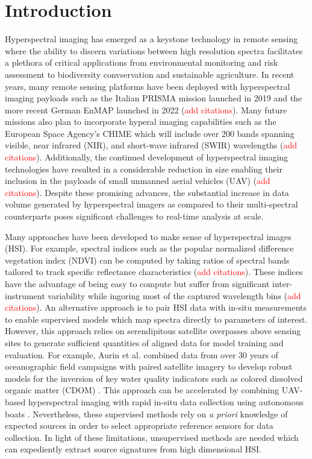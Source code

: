\documentclass[remotesensing,article,submit,pdftex,moreauthors]{Definitions/mdpi}
\begin{document}

\section{Introduction}


Hyperspectral imaging has emerged as a keystone technology in remote sensing where the ability to discern variations between high resolution spectra facilitates a plethora of critical applications from environmental monitoring and risk assessment to biodiversity convservation and sustainable agriculture. In recent years, many remote sensing platforms have been deployed with hyperspectral imaging payloads such as the Italian PRISMA mission launched in 2019 and the more recent German EnMAP launched in 2022 (\textcolor{red}{add citations}). Many future missions also plan to incorporate hyperal imaging capabilities such as the European Space Agency's CHIME which will include over $200$ bands spanning visible, near infrared (NIR), and short-wave infrared (SWIR) wavelengths (\textcolor{red}{add citations}). Additionally, the continued development of hyperspectral imaging technologies have resulted in a considerable reduction in size enabling their inclusion in the payloads of small unmanned aerial vehicles (UAV) (\textcolor{red}{add citations}). Despite these promising advances, the substantial increase in data volume generated by hyperspectral imagers as compared to their multi-spectral counterparts poses significant challenges to real-time analysis at scale.

Many approaches have been developed to make sense of hyperspectral images (HSI). For example, spectral indices such as the popular normalized difference vegetation index (NDVI) can be computed by taking ratios of spectral bands tailored to track specific reflectance characteristics (\textcolor{red}{add citations}). These indices have the advantage of being easy to compute but suffer from significant inter-instrument variability while ingoring most of the captured wavelength bins (\textcolor{red}{add citations}). An alternative approach is to pair HSI data with in-situ measurements to enable supervised models which map spectra directly to parameters of interest. However, this approach relies on serendipitous satellite overpasses above sensing sites to generate sufficient quantities of aligned data for model training and evaluation. For example, Aurin et al. combined data from over 30 years of oceanographic field campaigns with paired satellite imagery to develop robust models for the inversion of key water quality indicators such as colored dissolved organic matter (CDOM) \cite{aurin2018remote}. This approach can be accelerated by combining UAV-based hyperspectral imaging with rapid in-situ data collection using autonomous boats \cite{robot-team-1, robot-team-2}. Nevertheless, these supervised methods rely on \textit{a priori} knowledge of expected sources in order to select appropriate reference sensors for data collection. In light of these limitations, unsupervised methods are needed which can expediently extract source signatures from high dimensional HSI.
\end{document}
